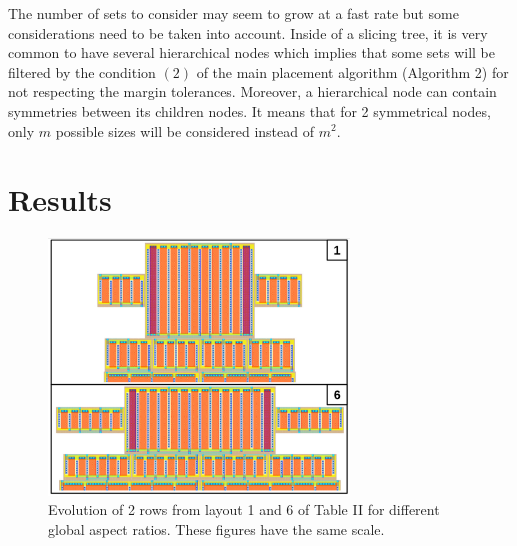 The number of sets to consider may seem to grow at a fast rate but some considerations need to be taken into account. Inside of a slicing tree, it is very common to have several hierarchical nodes which implies that some sets will be filtered by the condition $(2)$ of the main placement algorithm (Algorithm 2) for not respecting the margin tolerances. Moreover, a hierarchical node can contain symmetries between its children nodes. It means that for 2 symmetrical nodes, only $m$ possible sizes will be considered instead of $m^2$. 

\section{Results}

\begin{figure}[h]
\begin{center}
\includegraphics[width=80mm]{Figures/zoom.jpg}
\caption{Evolution of 2 rows from layout 1 and 6 of Table II for different global aspect ratios. These figures have the same scale.}
\end{center}
\end{figure}
\vspace{-0.5cm}


